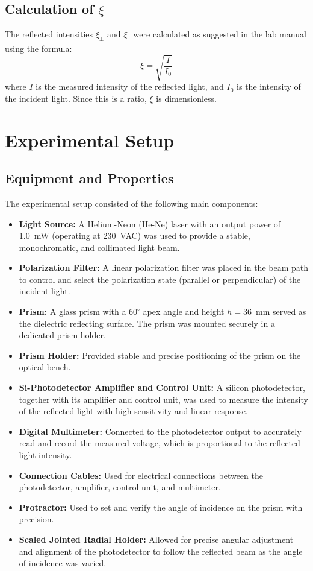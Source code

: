 \documentclass[journal]{IEEEtran}
\begin{document}
\subsection{Calculation of $\xi$}
The reflected intensities $\xi_{\perp}$ and $\xi_{\parallel}$ were calculated as suggested in the lab manual \cite{lab_manual} using the formula:
\begin{equation}
    \xi = \sqrt{\frac{I}{I_0}}
\end{equation}
where $I$ is the measured intensity of the reflected light, and $I_0$ is the intensity of the incident light. Since this is a ratio, $\xi$ is dimensionless.

\section{Experimental Setup}
\subsection{Equipment and Properties}
The experimental setup consisted of the following main components:

\begin{itemize}
    \item \textbf{Light Source:} A Helium-Neon (He-Ne) laser with an output power of 1.0~mW (operating at 230~VAC) was used to provide a stable, monochromatic, and collimated light beam.
    \item \textbf{Polarization Filter:} A linear polarization filter was placed in the beam path to control and select the polarization state (parallel or perpendicular) of the incident light.
    \item \textbf{Prism:} A glass prism with a $60^\circ$ apex angle and height $h = 36$~mm served as the dielectric reflecting surface. The prism was mounted securely in a dedicated prism holder.
    \item \textbf{Prism Holder:} Provided stable and precise positioning of the prism on the optical bench.
    \item \textbf{Si-Photodetector Amplifier and Control Unit:} A silicon photodetector, together with its amplifier and control unit, was used to measure the intensity of the reflected light with high sensitivity and linear response.
    \item \textbf{Digital Multimeter:} Connected to the photodetector output to accurately read and record the measured voltage, which is proportional to the reflected light intensity.
    \item \textbf{Connection Cables:} Used for electrical connections between the photodetector, amplifier, control unit, and multimeter.
    \item \textbf{Protractor:} Used to set and verify the angle of incidence on the prism with precision.
    \item \textbf{Scaled Jointed Radial Holder:} Allowed for precise angular adjustment and alignment of the photodetector to follow the reflected beam as the angle of incidence was varied.
\end{itemize}
\end{document}
